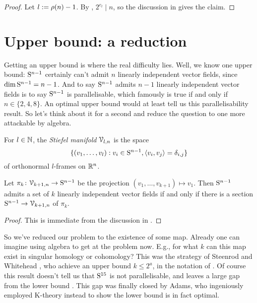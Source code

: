 \begin{proof}
  Let $l \ce \rho(n)-1$. By , $2^{e_l} \mid n$, so the
  discussion in  gives the claim.
\end{proof}


\section{Upper bound: a reduction}

Getting an upper bound is where the real difficulty lies. Well, we
know one upper bound: $\S^{n-1}$ certainly can't admit $n$ linearly
independent vector fields, since $\dim \S^{n-1} = n - 1$. And to say
$\S^{n-1}$ admits $n-1$ linearly independent vector fields is to say
$\S^{n-1}$ is parallelisable, which famously is true if and only if $n
\in \{2,4,8\}$. An optimal upper bound would at least tell us this
parallelisability result. So let's think about it for a second and
reduce the question to one more attackable by algebra.

\begin{definition}
  \label{stiefel}
  For $l \in \N$, the \emph{Stiefel manifold} $\V_{l,n}$ is the space
  \[
  \{(v_1,\ldots,v_l) : v_i \in \S^{n-1}, \langle v_i, v_j \rangle =
  \delta_{i,j}\}
  \]
  of orthonormal $l$-frames on $\R^n$.
\end{definition}

\begin{lemma}
  \label{section-reduction}
  Let $\pi_k \c \V_{k+1,n} \to \S^{n-1}$ be the projection
  $(v_1,\ldots,v_{k+1}) \mapsto v_1$. Then $\S^{n-1}$ admits a set of
  $k$ linearly independent vector fields if and only if there is a
  section $\S^{n-1} \to \V_{k+1,n}$ of $\pi_k$.
\end{lemma}

\begin{proof}
  This is immediate from the discussion in .
\end{proof}

So we've reduced our problem to the existence of some map. Already one
can imagine using algebra to get at the problem now. E.g., for what
$k$ can this map exist in singular homology or cohomology?  This was
the strategy of Steenrod and Whitehead \cite{steenrod-vfields}, who
achieve an upper bound $k \le 2^a$, in the notation of
. Of course this result doesn't tell us that
$\S^{15}$ is not parallelisable, and leaves a large gap from the lower
bound . This gap was finally closed by Adams,
who ingeniously employed K-theory instead to show the lower bound
 is in fact optimal.

